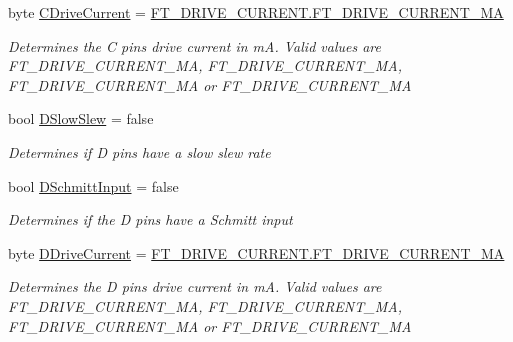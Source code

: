\begin{DoxyCompactItemize}
byte \mbox{\hyperlink{class_f_t_d2_x_x___n_e_t_1_1_f_t_d_i_1_1_f_t4232_h___e_e_p_r_o_m___s_t_r_u_c_t_u_r_e_a96bc49ef8d8a1f748d2f72439ca1d65f}{C\+Drive\+Current}} = \mbox{\hyperlink{class_f_t_d2_x_x___n_e_t_1_1_f_t_d_i_1_1_f_t___d_r_i_v_e___c_u_r_r_e_n_t_af6b404bcc6f2eb88bbc95b183d5729ea}{F\+T\+\_\+\+D\+R\+I\+V\+E\+\_\+\+C\+U\+R\+R\+E\+N\+T.\+F\+T\+\_\+\+D\+R\+I\+V\+E\+\_\+\+C\+U\+R\+R\+E\+N\+T\+\_\+MA}}
\begin{DoxyCompactList}\small\item\em Determines the C pins drive current in mA. Valid values are F\+T\+\_\+\+D\+R\+I\+V\+E\+\_\+\+C\+U\+R\+R\+E\+N\+T\+\_\+MA, F\+T\+\_\+\+D\+R\+I\+V\+E\+\_\+\+C\+U\+R\+R\+E\+N\+T\+\_\+MA, F\+T\+\_\+\+D\+R\+I\+V\+E\+\_\+\+C\+U\+R\+R\+E\+N\+T\+\_\+MA or F\+T\+\_\+\+D\+R\+I\+V\+E\+\_\+\+C\+U\+R\+R\+E\+N\+T\+\_\+MA \end{DoxyCompactList}\item 
bool \mbox{\hyperlink{class_f_t_d2_x_x___n_e_t_1_1_f_t_d_i_1_1_f_t4232_h___e_e_p_r_o_m___s_t_r_u_c_t_u_r_e_a91b402a49dad418b5acdbb5433669fde}{D\+Slow\+Slew}} = false
\begin{DoxyCompactList}\small\item\em Determines if D pins have a slow slew rate \end{DoxyCompactList}\item 
bool \mbox{\hyperlink{class_f_t_d2_x_x___n_e_t_1_1_f_t_d_i_1_1_f_t4232_h___e_e_p_r_o_m___s_t_r_u_c_t_u_r_e_ac2d41adfe0f32ca60d0a8e23470c1e63}{D\+Schmitt\+Input}} = false
\begin{DoxyCompactList}\small\item\em Determines if the D pins have a Schmitt input \end{DoxyCompactList}\item 
byte \mbox{\hyperlink{class_f_t_d2_x_x___n_e_t_1_1_f_t_d_i_1_1_f_t4232_h___e_e_p_r_o_m___s_t_r_u_c_t_u_r_e_a5542162377465ad598456a7ecd00640b}{D\+Drive\+Current}} = \mbox{\hyperlink{class_f_t_d2_x_x___n_e_t_1_1_f_t_d_i_1_1_f_t___d_r_i_v_e___c_u_r_r_e_n_t_af6b404bcc6f2eb88bbc95b183d5729ea}{F\+T\+\_\+\+D\+R\+I\+V\+E\+\_\+\+C\+U\+R\+R\+E\+N\+T.\+F\+T\+\_\+\+D\+R\+I\+V\+E\+\_\+\+C\+U\+R\+R\+E\+N\+T\+\_\+MA}}
\begin{DoxyCompactList}\small\item\em Determines the D pins drive current in mA. Valid values are F\+T\+\_\+\+D\+R\+I\+V\+E\+\_\+\+C\+U\+R\+R\+E\+N\+T\+\_\+MA, F\+T\+\_\+\+D\+R\+I\+V\+E\+\_\+\+C\+U\+R\+R\+E\+N\+T\+\_\+MA, F\+T\+\_\+\+D\+R\+I\+V\+E\+\_\+\+C\+U\+R\+R\+E\+N\+T\+\_\+MA or F\+T\+\_\+\+D\+R\+I\+V\+E\+\_\+\+C\+U\+R\+R\+E\+N\+T\+\_\+MA \end{DoxyCompactList}\item 

\end{DoxyCompactItemize}
